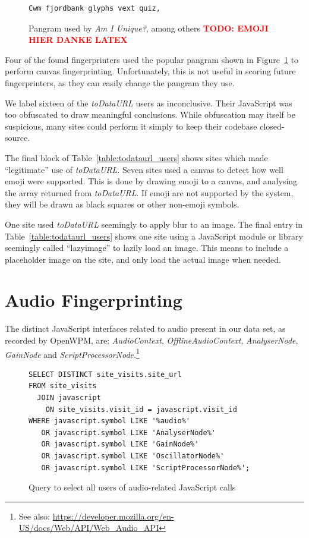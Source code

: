 \documentclass[
    fontsize=12pt,
    headings=small,
    parskip=half,
    bibliography=totoc,
    numbers=noenddot,
    open=any
    ]{scrreprt}
\newcommand{\todo}[1]{\textcolor{red}{\textbf{TODO: #1}}}
\begin{document}
\begin{figure}
\begin{verbatim}
Cwm fjordbank glyphs vext quiz, 
\end{verbatim}
\caption{Pangram used by \textit{Am I Unique?}, among others \todo{EMOJI HIER DANKE LATEX}}
\label{code:pangram}
\end{figure}

Four of the found fingerprinters used the popular pangram shown in
Figure~\ref{code:pangram} to perform canvas fingerprinting.
Unfortunately, this is not useful in scoring future fingerprinters,
as they can easily change the pangram they use.

We label sixteen of the \textit{toDataURL} users as inconclusive.
Their JavaScript was too obfuscated to draw meaningful conclusions.
While obfuscation may itself be suspicious, many sites could perform
it simply to keep their codebase closed-source.

The final block of Table~\ref{table:todataurl_users} shows sites which
made ``legitimate'' use of \textit{toDataURL}. Seven sites used a canvas
to detect how well emoji were supported. This is done by drawing emoji
to a canvas, and analysing the array returned from \textit{toDataURL}.
If emoji are not supported by the system, they will be drawn as black
squares or other non-emoji symbols.

One site used \textit{toDataURL} seemingly to apply blur to an image.
The final entry in Table~\ref{table:todataurl_users} shows one site
using a JavaScript module or library seemingly called ``lazyimage''
to lazily load an image. This means to include a placeholder
image on the site, and only load the actual image when needed.


\section{Audio Fingerprinting}
The distinct JavaScript interfaces related to audio present in our data set,
as recorded by OpenWPM, are:
\textit{AudioContext},
\textit{OfflineAudioContext},
\textit{AnalyserNode},
\textit{GainNode} and \textit{ScriptProcessorNode}.\footnote{See also: \url{https://developer.mozilla.org/en-US/docs/Web/API/Web_Audio_API}}

\begin{figure}
\begin{verbatim}
SELECT DISTINCT site_visits.site_url
FROM site_visits
  JOIN javascript
    ON site_visits.visit_id = javascript.visit_id
WHERE javascript.symbol LIKE '%audio%'
   OR javascript.symbol LIKE 'AnalyserNode%'
   OR javascript.symbol LIKE 'GainNode%'
   OR javascript.symbol LIKE 'OscillatorNode%'
   OR javascript.symbol LIKE 'ScriptProcessorNode%';
\end{verbatim}
\caption{Query to select all users of audio-related JavaScript calls}
\label{code:audio_query}
\end{figure}
\end{document}
